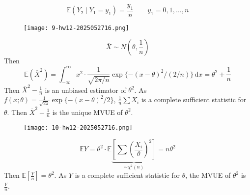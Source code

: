 \[
\mathbb{E}(Y_2 \mid Y_1=y_1)=\frac{y_1}{n}\qquad y_1=0,1,\dots,n
\]
\begin{exercise}
\begin{figure}[H]
\centering
\texttt{[image: 9-hw12-2025052716.png]}
\label{}
\end{figure}
\end{exercise}
\[
\overline{X}\sim N\left( \theta,\frac{1}{n} \right)
\]
Then
\[
\mathbb{E}(\overline{X}^2)=\int_{-\infty}^{\infty} x^2\cdot\frac{1}{\sqrt{ 2\pi/n  }}\exp \{ -(x-\theta)^2/(2/n ) \} \, \mathrm{d}x =\theta^{2}+\frac{1}{n}
\]
Then $\overline{X}^2-\frac{1}{n}$ is an unbiased estimator of $\theta^{2}$. As $f(x;\theta)=\frac{1}{\sqrt{ 2\pi  }}\exp \{ -(x-\theta)^2/2 \}$, $\frac{1}{n}\sum X_i$ is a complete sufficient statistic for $\theta$. Then $\overline{X}^2-\frac{1}{n}$ is the unique MVUE of $\theta^{2}$.

\begin{exercise}
\begin{figure}[H]
\centering
\texttt{[image: 10-hw12-2025052716.png]}
\label{}
\end{figure}
\end{exercise}
\[
\mathbb{E}Y=\theta^{2}\cdot \mathbb{E}\underbrace{ \left[ \sum\left( \frac{X_i}{\theta} \right)^2 \right] }_{ \sim \chi^{2}(n) }=n\theta^{2}
\]
Then $\mathbb{E}\left[ \frac{Y}{n} \right]=\theta^{2}$. As $Y$ is a complete sufficient statistic for $\theta$, the MVUE of $\theta^{2}$ is $\frac{Y}{n}$.

